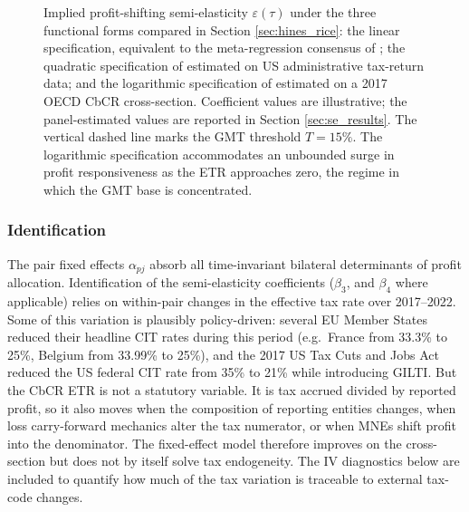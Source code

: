 \documentclass[11pt,a4paper]{article}
\begin{document}
\begin{figure}[H]
\caption[Implied semi-elasticity under three functional forms.]{Implied profit-shifting semi-elasticity $\varepsilon(\tau)$ under the three functional forms compared in Section \ref{sec:hines_rice}: the linear specification, equivalent to the meta-regression consensus of \citet{heckemeyer2017}; the quadratic specification of \citet{dowd2017} estimated on US administrative tax-return data; and the logarithmic specification of \citet{garcia-bernardo2024} estimated on a 2017 OECD CbCR cross-section. Coefficient values are illustrative; the panel-estimated values are reported in Section \ref{sec:se_results}. The vertical dashed line marks the GMT threshold $T=15\%$. The logarithmic specification accommodates an unbounded surge in profit responsiveness as the ETR approaches zero, the regime in which the GMT base is concentrated.}
\label{fig:semi_elasticity_forms}
\end{figure}

\subsubsection{Identification}\label{sec:identification}

The pair fixed effects $\alpha_{pj}$ absorb all time-invariant bilateral determinants of profit allocation. Identification of the semi-elasticity coefficients ($\beta_3$, and $\beta_4$ where applicable) relies on within-pair changes in the effective tax rate over 2017--2022. Some of this variation is plausibly policy-driven: several EU Member States reduced their headline CIT rates during this period (e.g.\ France from 33.3\% to 25\%, Belgium from 33.99\% to 25\%), and the 2017 US Tax Cuts and Jobs Act reduced the US federal CIT rate from 35\% to 21\% while introducing GILTI. But the CbCR ETR is not a statutory variable. It is tax accrued divided by reported profit, so it also moves when the composition of reporting entities changes, when loss carry-forward mechanics alter the tax numerator, or when MNEs shift profit into the denominator. The fixed-effect model therefore improves on the cross-section but does not by itself solve tax endogeneity. The IV diagnostics below are included to quantify how much of the tax variation is traceable to external tax-code changes.
\end{document}
